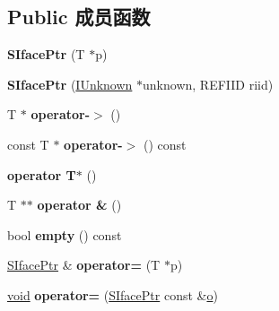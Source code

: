 \subsection*{Public 成员函数}
\begin{DoxyCompactItemize}
\item 
\mbox{\label{struct_s_iface_ptr_a4f8a6ddc388fda52d0aa33ad2638772d}} 
{\bfseries S\+Iface\+Ptr} (T $\ast$p)
\item 
\mbox{\label{struct_s_iface_ptr_af26749c8a47087f8f39cf90fd48f44d5}} 
{\bfseries S\+Iface\+Ptr} (\hyperlink{interface_i_unknown}{I\+Unknown} $\ast$unknown, R\+E\+F\+I\+ID riid)
\item 
\mbox{\label{struct_s_iface_ptr_abbe7ffb3ef957df6bb98a6a9f8de95d5}} 
T $\ast$ {\bfseries operator-\/$>$} ()
\item 
\mbox{\label{struct_s_iface_ptr_a2f5b2b24f23a14c3d1269c17ccbb79d2}} 
const T $\ast$ {\bfseries operator-\/$>$} () const
\item 
\mbox{\label{struct_s_iface_ptr_a680f706e7df6ef64f74a85f0adce4fa2}} 
{\bfseries operator T$\ast$} ()
\item 
\mbox{\label{struct_s_iface_ptr_a7157ba3f360208d0ffcd916da1a35d56}} 
T $\ast$$\ast$ {\bfseries operator \&} ()
\item 
\mbox{\label{struct_s_iface_ptr_aafd834ca7b0cd7c87efe634b368c9a10}} 
bool {\bfseries empty} () const
\item 
\mbox{\label{struct_s_iface_ptr_a49377a8c03a2bf7769f9fc9268468c7a}} 
\hyperlink{struct_s_iface_ptr}{S\+Iface\+Ptr} \& {\bfseries operator=} (T $\ast$p)
\item 
\mbox{\label{struct_s_iface_ptr_a471e94e1412904ea4daf6e3d4b4d53a1}} 
\hyperlink{interfacevoid}{void} {\bfseries operator=} (\hyperlink{struct_s_iface_ptr}{S\+Iface\+Ptr} const \&\hyperlink{opengl_2mesa_2main_2extensions_8c_ac02068cf344ef10efe2778c164d1233e}{o})
\item 
\mbox{\label{struct_s_iface_ptr_afe554cf6400d8b50e7f931f2f8bc63ab}} 
$$
\end{DoxyCompactItemize}
